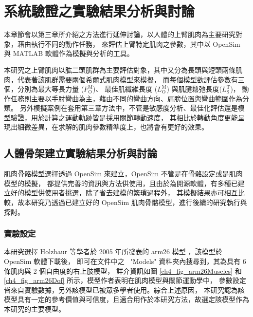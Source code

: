 \chapter{系統驗證之實驗結果分析與討論}
\fontsize{12pt}{18pt}\selectfont %

本章節會以第三章所介紹之方法進行延伸討論，以人體的上臂肌肉為主要研究對象，藉由執行不同的動作任務，
來評估上臂特定肌肉之參數，其中以 OpenSim 與 MATLAB 軟體作為模擬與分析的工具。

本研究之上臂肌肉以肱二頭肌群為主要評估對象，其中又分為長頭與短頭兩條肌肉，代表著該肌群需要兩個希爾式肌肉模型來模擬，
而每個模型欲評估參數有三個，分別為最大等長力量 ($F^\mathrm{M}_\mathrm{O}$)、
最佳肌纖維長度 ($L^\mathrm{M}_\mathrm{O}$) 與肌腱鬆弛長度($L^\mathrm{T}_\mathrm{S}$)，
動作任務則主要以手肘彎曲為主，藉由不同的彎曲方向、肩膀位置與彎曲範圍作為分類。
另外模擬案例在套用第三章方法中，不管是敏感度分析、最佳化評估還是模型驗證，用於計算之運動軌跡皆是採用關節轉動速度，
其相比於轉動角度更能呈現出細微差異，在求解的肌肉參數精準度上，也將會有更好的效果。

\section{人體骨架建立實驗結果分析與討論}
肌肉骨骼模型選擇透過 OpenSim 來建立，OpenSim 不管是在骨骼設定或是肌肉模型的模擬，
都提供完善的資訊與方法供使用，且由於為開源軟體，有多種已建立好的模型供使用者挑選，除了省去建模的繁瑣過程外，
其模擬結果亦可相互比較，故本研究乃透過已建立好的 OpenSim 肌肉骨骼模型，進行後續的研究執行與探討。

\subsection{實驗設定}
本研究選擇 Holzbaur 等學者於 2005 年所發表的 arm26 模型 \cite{holzbaur2005model}，該模型於 OpenSim 軟體下載後，
即可在文件中之 \ "Models" 資料夾內搜尋到，其為具有 6 條肌肉與 2 個自由度的右上肢模型，
詳介資訊如圖 \ref{ch4_fig_arm26Muscles} 和 \ref{ch4_fig_arm26Dof} 所示，模型作者表明在肌肉模型與關節運動學中，
參數設定皆來自實驗數據，另外該模型已被眾多學者使用。綜合上述原因，
本研究認為該模型具有一定的參考價值與可信度，且適合用作於本研究方法，故選定該模型作為本研究的主要模型。

